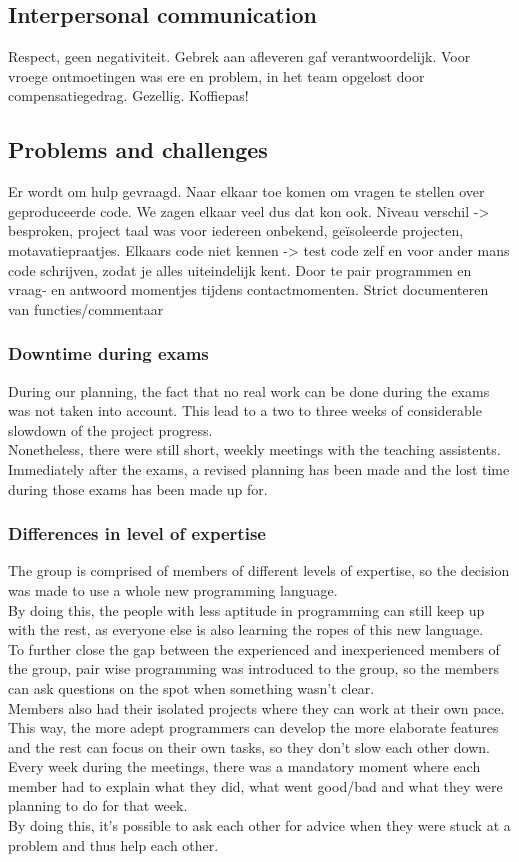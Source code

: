 \documentclass[10pt,a4paper]{report}
\begin{document}
		\subsection{Interpersonal communication}
Respect, geen negativiteit. Gebrek aan afleveren gaf verantwoordelijk. Voor vroege ontmoetingen was ere en problem, in het team opgelost door compensatiegedrag. Gezellig. Koffiepas! 

		\subsection{Problems and challenges}
Er wordt om hulp gevraagd. Naar elkaar toe komen om vragen te stellen over geproduceerde code. We zagen elkaar veel dus dat kon ook.
	Niveau verschil -> besproken, project taal was voor iedereen onbekend, geïsoleerde projecten, motavatiepraatjes.
Elkaars code niet kennen -> test code zelf en voor ander mans code schrijven, zodat je alles uiteindelijk kent. Door te pair programmen en vraag- en antwoord momentjes tijdens contactmomenten. Strict documenteren van functies/commentaar
			\subsubsection*{Downtime during exams}
				During our planning, the fact that no real work can be done during the exams was not taken into account. This lead to a two to three weeks of considerable slowdown of the project progress.\\
				Nonetheless, there were still short, weekly meetings with the teaching assistents. Immediately after the exams, a revised planning has been made and the lost time during those exams has been made up for.
			\subsubsection*{Differences in level of expertise}
				The group is comprised of members of different levels of expertise, so the decision was made to use a whole new programming language.\\ 
				By doing this, the people with less aptitude in programming can still keep up with the rest, as everyone else is also learning the ropes of this new language.\\
				To further close the gap between the experienced and inexperienced members of the group, pair wise programming was introduced to the group, so the members can ask questions on the spot when something wasn't clear.\\
				Members also had their isolated projects where they can work at their own pace. This way, the more adept programmers can develop the more elaborate features and the rest can focus on their own tasks, so they don't slow each other down.\\ 
				Every week during the meetings, there was a mandatory moment where each member had to explain what they did, what went good/bad and what they were planning to do for that week.\\ 
				By doing this, it's possible to ask each other for advice when they were stuck at a problem and thus help each other.
\end{document}
